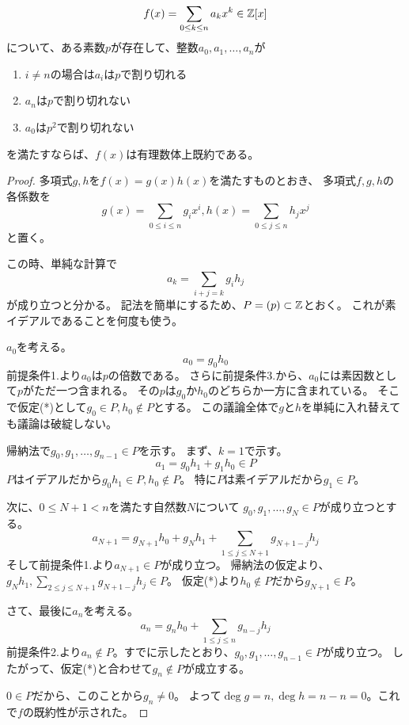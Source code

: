 \documentclass[a4j]{jarticle}
\begin{document}
\begin{Them}
\[ f(x)=\sum_{0 \leq k \leq n}{a_k x^k} \in \mathbb{Z}[x] \]
について、ある素数$p$が存在して、整数$a_0, a_1, \dots, a_n$が
    \begin{enumerate}
    \item $i \neq n$の場合は$a_i$は$p$で割り切れる
    \item $a_n$は$p$で割り切れない
    \item $a_0$は$p^2$で割り切れない
    \end{enumerate}
を満たすならば、$f(x)$は有理数体上既約である。
\end{Them}
\begin{proof}
多項式$g,h$を$f(x)=g(x) h(x)$を満たすものとおき、
多項式$f, g, h$の各係数を
\[ g(x)=\sum_{0 \leq i \leq n}{g_i x^i}, h(x)=\sum_{0 \leq j \leq n}{h_j x^j} \]
と置く。

この時、単純な計算で
\[ a_{k}=\sum_{i+j=k}{g_i h_j} \]
が成り立つと分かる。
記法を簡単にするため、$P=(p) \subset \mathbb{Z}$とおく。
これが素イデアルであることを何度も使う。

$a_0$を考える。
\[ a_0=g_0 h_0 \]
前提条件1.より$a_0$は$p$の倍数である。
さらに前提条件3.から、$a_0$には素因数として$p$がただ一つ含まれる。
その$p$は$g_0$か$h_0$のどちらか一方に含まれている。
そこで仮定(*)として$g_0 \in P, h_0 \not \in P$とする。
この議論全体で$g$と$h$を単純に入れ替えても議論は破綻しない。

帰納法で$g_0, g_1, \dots, g_{n-1} \in P$を示す。
まず、$k=1$で示す。
\[ a_1=g_0 h_1 + g_1 h_0 \in P \]
$P$はイデアルだから$g_0 h_1 \in P, h_0 \not \in P$。
特に$P$は素イデアルだから$g_1 \in P$。

次に、$0 \leq N+1 < n$を満たす自然数$N$について
$g_0, g_1, \dots, g_{N} \in P$が成り立つとする。
\[ a_{N+1}=g_{N+1} h_0+g_{N} h_1+\sum_{1 \leq j \leq N+1}{g_{N+1-j} h_j } \]
そして前提条件1.より$a_{N+1} \in P$が成り立つ。
帰納法の仮定より、$g_{N} h_1, \sum_{2 \leq j \leq N+1}{g_{N+1-j} h_j } \in P$。
仮定(*)より$h_0 \not \in P$だから$g_{N+1} \in P$。

さて、最後に$a_n$を考える。
\[ a_{n}=g_{n} h_0+\sum_{1 \leq j \leq n}{g_{n-j} h_j } \]
前提条件2.より$a_{n} \not \in P$。すでに示したとおり、$g_0, g_1, \dots, g_{n-1} \in P$が成り立つ。
したがって、仮定(*)と合わせて$g_n \not \in P$が成立する。

$0 \in P$だから、このことから$g_n \neq 0$。
よって$\deg g=n, \deg h=n-n=0$。これで$f$の既約性が示された。
\end{proof}
\end{document}
